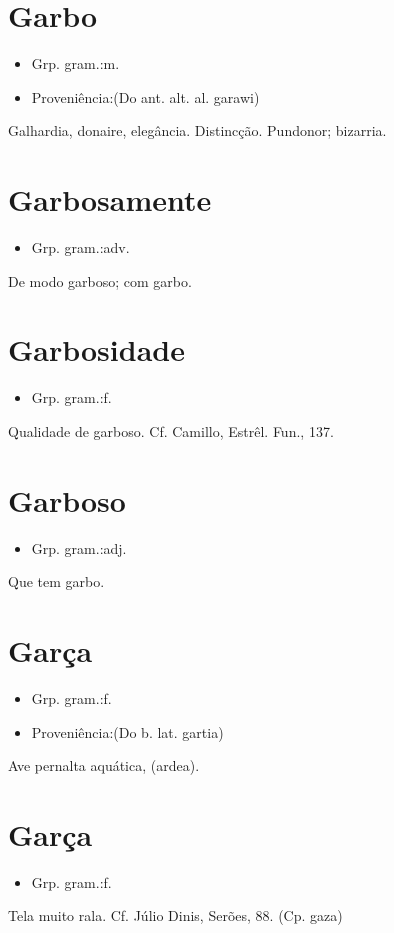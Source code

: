 \section{Garbo}
\begin{itemize}
\item {Grp. gram.:m.}
\end{itemize}
\begin{itemize}
\item {Proveniência:(Do ant. alt. al. \textunderscore garawi\textunderscore )}
\end{itemize}
Galhardia, donaire, elegância.
Distincção.
Pundonor; bizarria.
\section{Garbosamente}
\begin{itemize}
\item {Grp. gram.:adv.}
\end{itemize}
De modo garboso; com garbo.
\section{Garbosidade}
\begin{itemize}
\item {Grp. gram.:f.}
\end{itemize}
Qualidade de garboso. Cf. Camillo, \textunderscore Estrêl. Fun.\textunderscore , 137.
\section{Garboso}
\begin{itemize}
\item {Grp. gram.:adj.}
\end{itemize}
Que tem garbo.
\section{Garça}
\begin{itemize}
\item {Grp. gram.:f.}
\end{itemize}
\begin{itemize}
\item {Proveniência:(Do b. lat. \textunderscore gartia\textunderscore )}
\end{itemize}
Ave pernalta aquática, (\textunderscore ardea\textunderscore ).
\section{Garça}
\begin{itemize}
\item {Grp. gram.:f.}
\end{itemize}
Tela muito rala. Cf. Júlio Dinis, \textunderscore Serões\textunderscore , 88.
(Cp. \textunderscore gaza\textunderscore )
